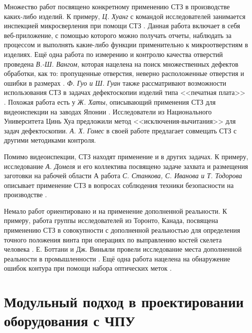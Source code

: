 Множество работ посвящено конкретному применению СТЗ в производстве каких-либо изделий. К примеру, \textit{Ц. Хуанг} с командой исследователей занимается инспекцией микросверления при помощи СТЗ \cite{HUANG20095944, SU2006328}. Данная работа включает в себя веб-приложение, с помощью которого можно получать отчеты, наблюдать за процессом и выполнять какие-либо функции применительно к микроотверстиям в изделиях. Ещё одна работа по измерению и контролю качества отверстий проведена \textit{В.-Ш. Вангом}, которая нацелена на поиск множественных дефектов обработки, как то: пропущенные отверстия, неверно расположенные отверстия и ошибки в размерах \cite{7752853}. \textit{Ф. Гуо и Ш. Гуан} также рассматривают возможности использования СТЗ в задачах дефектоскопии изделий типа <<печатная плата>> \cite{5997485}. Похожая работа есть у \textit{Ж. Хаты}, описывающий применения СТЗ для видеоиспекции на заводах Японии \cite{149241}. Исследователи из Национального Университета Цинь Хуа предложили метод <<исключения-вычитания>> для задач дефектоскопии. \textit{А. Х. Гомес} в своей работе предлагает совмещать СТЗ с другими методиками контроля.

Помимо видеоиспекции, СТЗ находят применение и в других задачах. К примеру, исследование \textit{А. Домеля} и его коллектива посвящено задаче захвата и размещения заготовки на рабочей области \cite{7358978} А работа \textit{С. Станкова, С. Иванова и Т. Тодорова} описывает применение СТЗ в вопросах соблюдения техники безопасности на производстве \cite{8878583}.

Немало работ ориентировано и на применение дополненной реальности. К примеру, работа группы исследователей из Торонто, Канада, посвящена применению СТЗ в совокупности с дополненной реальностью для определения точного положения винта при операциях по выправлению костей скелета человека \cite{NGUYEN2020350}. Е. Боттани и Дж. Виньяли провели исследование места дополненной реальности в промышленности \cite{24725854}. Ещё одна работа нацелена на обнаружение ошибок контура при помощи набора оптических меток \cite{8409552}.

\section{Модульный подход в проектировании оборудования с ЧПУ} \label{sect1_4}

